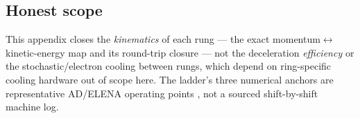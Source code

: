 \subsection{Honest scope}
\label{app:decel-scope}

This appendix closes the \emph{kinematics} of each rung --- the exact
momentum$\leftrightarrow$kinetic-energy map and its round-trip closure --- not
the deceleration \emph{efficiency} or the stochastic/electron cooling between
rungs, which depend on ring-specific cooling hardware out of scope here. The
ladder's three numerical anchors are representative AD/ELENA operating points
\citep{maury1997ad,maury2014elena}, not a sourced shift-by-shift machine log.
